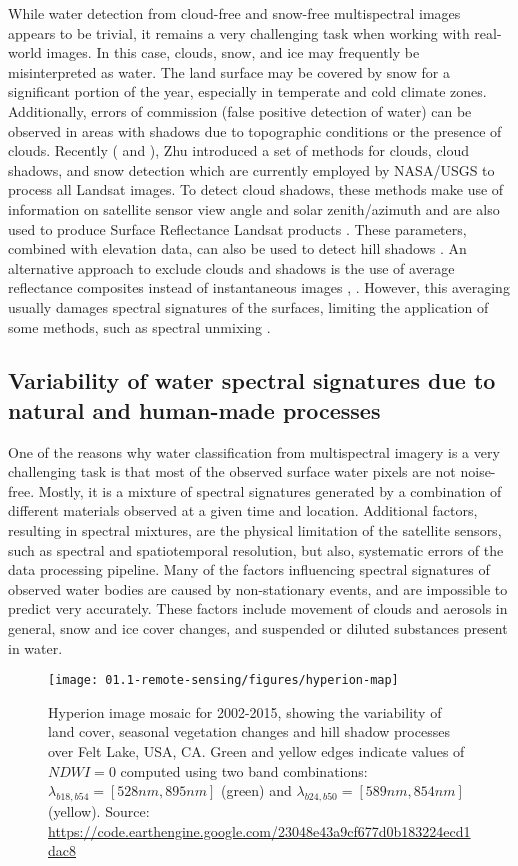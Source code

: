 While water detection from cloud-free and snow-free multispectral images appears to be trivial, it remains a very challenging task when working with real-world images. In this case, clouds, snow, and ice may frequently be misinterpreted as water. The land surface may be covered by snow for a significant portion of the year, especially in temperate and cold climate zones. Additionally, errors of commission (false positive detection of water) can be observed in areas with shadows due to topographic conditions or the presence of clouds. Recently (\citet{Zhu2014} and \citet{Zhu2012}), Zhu introduced a set of methods for clouds, cloud shadows, and snow detection which are currently employed by NASA/USGS to process all Landsat images. To detect cloud shadows, these methods make use of information on satellite sensor view angle and solar zenith/azimuth and are also used to produce Surface Reflectance Landsat products \citet{webLandsat}. These parameters, combined with elevation data, can also be used to detect hill shadows \citet{Tan2013}. An alternative approach to exclude clouds and shadows is the use of average reflectance composites instead of instantaneous images \citet{Potapov2012}, \citet{Hansen2013}. However, this averaging usually damages spectral signatures of the surfaces, limiting the application of some methods, such as spectral unmixing \citet{keshava2003survey}.

\subsection{Variability of water spectral signatures due to natural and human-made processes}

One of the reasons why water classification from multispectral imagery is a very challenging task is that most of the observed surface water pixels are not noise-free. Mostly, it is a mixture of spectral signatures generated by a combination of different materials observed at a given time and location. Additional factors, resulting in spectral mixtures, are the physical limitation of the satellite sensors, such as spectral and spatiotemporal resolution, but also, systematic errors of the data processing pipeline. Many of the factors influencing spectral signatures of observed water bodies are caused by non-stationary events, and are impossible to predict very accurately. These factors include movement of clouds and aerosols in general, snow and ice cover changes, and suspended or diluted substances present in water.

\begin{figure}
	\texttt{[image: 01.1-remote-sensing/figures/hyperion-map]}
	\caption{Hyperion image mosaic for 2002-2015, showing the variability of land cover, seasonal vegetation changes and hill shadow processes over Felt Lake, USA, CA. Green and yellow edges indicate values of $NDWI=0$ computed using two band combinations: $\lambda_{b18, b54} = [528nm, 895nm]$ (green) and $\lambda_{b24, b50} = [589nm, 854nm]$ (yellow).
	Source: \url{https://code.earthengine.google.com/23048e43a9cf677d0b183224ecd1dac8}} 
	\label{fig:intro-hyperion-example}
	
\end{figure}

